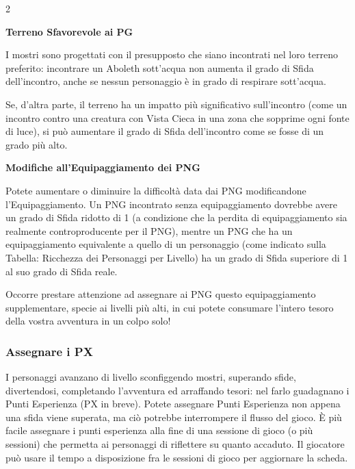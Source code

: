 \begin{multicols}{2}
\medskip

\textbf{Terreno Sfavorevole ai PG}

I mostri sono progettati con il presupposto che siano incontrati nel loro terreno preferito: incontrare un Aboleth sott'acqua non aumenta il grado di Sfida dell'incontro, anche se nessun personaggio è in grado di respirare sott'acqua.

Se, d'altra parte, il terreno ha un impatto più significativo sull'incontro (come un incontro contro una creatura con Vista Cieca in una zona che sopprime ogni fonte di luce), si può aumentare il grado di Sfida dell'incontro come se fosse di un grado più alto.

\medskip

\textbf{Modifiche all'Equipaggiamento dei PNG}

Potete aumentare o diminuire la difficoltà data dai PNG modificandone l'Equipaggiamento. Un PNG incontrato senza equipaggiamento dovrebbe avere un grado di Sfida ridotto di 1 (a condizione che la perdita di equipaggiamento sia realmente controproducente per il PNG), mentre un PNG che ha un equipaggiamento equivalente a quello di un personaggio (come indicato sulla Tabella: Ricchezza dei Personaggi per Livello) ha un grado di Sfida superiore di 1 al suo grado di Sfida reale.

Occorre prestare attenzione ad assegnare ai PNG questo equipaggiamento supplementare, specie ai livelli più alti, in cui potete consumare l'intero tesoro della vostra avventura in un colpo solo!

\subsubsection{Assegnare i PX}\label{assegnarepuntiesperienza}

I personaggi avanzano di livello sconfiggendo mostri, superando sfide, divertendosi, completando l'avventura ed arraffando tesori: nel farlo guadagnano i Punti Esperienza (PX in breve). Potete assegnare Punti Esperienza non appena una sfida viene superata, ma ciò potrebbe interrompere il flusso del gioco. È più facile assegnare i punti esperienza alla fine di una sessione di gioco (o più sessioni) che permetta ai personaggi di riflettere su quanto accaduto. Il giocatore può usare il tempo a disposizione fra le sessioni di gioco per aggiornare la scheda.



\end{multicols}
